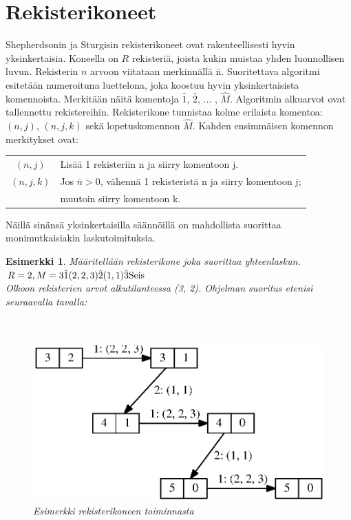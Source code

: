 \documentclass[a4paper, 12pt]{article}
\newtheorem{example}{Esimerkki}
\begin{document}
\section{Rekisterikoneet}
Shepherdsonin ja Sturgisin rekisterikoneet ovat rakenteellisesti hyvin yksinkertaisia. Koneella on $R$ rekisteriä, joista kukin muistaa yhden luonnollisen luvun. Rekisterin $n$ arvoon viitataan merkinnällä \={n}. Suoritettava algoritmi esitetään numeroituna luettelona, joka koostuu hyvin yksinkertaisista komennoista. Merkitään näitä komentoja $\hat{1}$, $\hat{2}$, ... , $\hat{M}$. Algoritmin alkuarvot ovat tallennettu rekistereihin. Rekisterikone tunnistaa kolme erilaista komentoa: $(n,j)$, $(n,j,k)$ sekä lopetuskomennon $\hat{M}$. Kahden ensimmäisen komennon merkitykset ovat:

\begin{tabular}{c l}
$(n, j)$ & Lisää 1 rekisteriin n ja siirry komentoon j. \\
$(n, j, k)$ & Jos $\bar{n} > 0$, vähennä 1 rekisteristä n ja siirry komentoon j; \\
& muutoin siirry komentoon k.\\
\end{tabular}


Näillä sinänsä yksinkertaisilla säännöillä on mahdollista suorittaa monimutkaisiakin laskutoimituksia.

\begin{example}
Määritellään rekisterikone joka suorittaa yhteenlaskun.
\\
\begin{math} \\
R = 2, M = 3 \\
\hat{1} (2,2,3) \\
\hat{2} (1,1) \\
\hat{3} \text{Seis}\\
\end{math}
\\
Olkoon rekisterien arvot alkutilanteessa (3, 2). Ohjelman suoritus etenisi seuraavalla tavalla:\\ \\
\\
\begin{figure}[H]
\begin{center}
\includegraphics{graph3.eps}
\caption{Esimerkki rekisterikoneen toiminnasta}
\end{center}
\end{figure}


\end{example}
\end{document}
